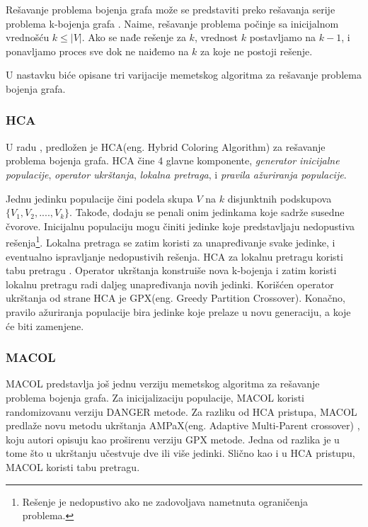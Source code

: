 \documentclass[a4paper]{article}
\begin{document}
Rešavanje problema bojenja grafa može se predstaviti preko rešavanja serije problema k-bojenja grafa \cite{galinier1999hybrid}. 
Naime, rešavanje problema počinje sa inicijalnom vrednošću $k \leq |V|$. 
Ako se nađe rešenje za $k$, vrednost $k$ postavljamo na $k-1$, i ponavljamo proces sve dok ne naiđemo na $k$ za koje ne postoji rešenje.

U nastavku biće opisane tri varijacije memetskog algoritma za rešavanje problema bojenja grafa. 

\subsubsection{HCA}
U radu \cite{galinier1999hybrid}, predložen je HCA(eng. Hybrid Coloring Algorithm) za rešavanje problema bojenja grafa.
HCA čine 4 glavne komponente, \textit{generator inicijalne populacije}, \textit{operator ukrštanja}, \textit{lokalna pretraga}, i \textit{pravila ažuriranja populacije}.

Jednu jedinku populacije čini podela skupa $V$ na $k$  disjunktnih podskupova $\{V_1, V_2, ...., V_k\}$. Takođe, dodaju se penali onim jedinkama koje sadrže susedne čvorove. Inicijalnu populaciju mogu činiti jedinke koje predstavljaju nedopustiva rešenja\footnote{Rešenje je nedopustivo ako ne zadovoljava nametnuta ograničenja problema.}. 
Lokalna pretraga se zatim koristi za unapređivanje svake jedinke, i eventualno ispravljanje nedopustivih rešenja.
HCA za lokalnu pretragu koristi tabu pretragu \cite{tabu_pretraga_miskovic}.
Operator ukrštanja konstruiše nova k-bojenja i zatim koristi lokalnu pretragu radi daljeg unapređivanja novih jedinki. 
Korišćen operator ukrštanja od strane HCA je GPX(eng. Greedy Partition Crossover)\cite{galinier1999hybrid}.
Konačno, pravilo ažuriranja populacije bira jedinke koje prelaze u novu generaciju, a koje će biti zamenjene.
\subsubsection{MACOL}
MACOL \cite{lu2010memetic} predstavlja još jednu verziju memetskog algoritma za rešavanje problema bojenja grafa. Za inicijalizaciju populacije, MACOL koristi randomizovanu verziju DANGER \cite{glover1996coloring} metode. 
Za razliku od HCA pristupa, MACOL predlaže novu metodu ukrštanja AMPaX(eng. Adaptive Multi-Parent crossover) \cite{lu2010memetic}, koju autori opisuju kao proširenu verziju GPX metode. Jedna od razlika je u tome što u ukrštanju učestvuje dve ili više jedinki. Slično kao i u HCA pristupu, MACOL koristi tabu pretragu.
\end{document}
